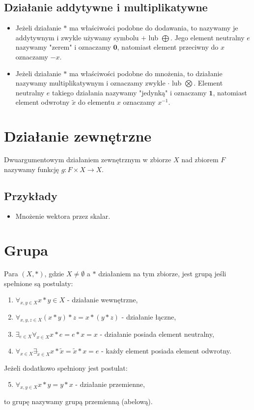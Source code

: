 \documentclass{article}
\begin{document}
\subsection{Działanie addytywne i multiplikatywne}
\begin{itemize}
    \item Jeżeli działanie $*$ ma właściwości podobne do dodawania, to nazywamy je addytywnym i zwykle używamy symbolu $+$ lub $\bigoplus$.
    Jego element neutralny $e$ nazywamy "zerem" i oznaczamy $\textbf{0}$, natomiast element przeciwny do $x$ oznaczamy $-x$.
    \item Jeżeli działanie $*$ ma właściwości podobne do mnożenia, to działanie nazywamy multiplikatywnym i oznaczamy zwykle $\cdot$ lub $\bigotimes$.
    Element neutralny $e$ takiego działania nazywamy "jedynką" i oznaczamy $\textbf{1}$, natomiast element odwrotny $\tilde{x}$ do elementu $x$ oznaczamy $x^{-1}$.
\end{itemize}

\section{Działanie zewnętrzne}
Dwuargumentowym działaniem zewnętrznym w zbiorze $X$ nad zbiorem $F$ nazywamy funkcję $g : F \times X \rightarrow X$.

\subsection{Przykłady}
\begin{itemize}
    \item Mnożenie wektora przez skalar.
\end{itemize}

\section{Grupa}
Para $(X, *)$, gdzie $X \neq \emptyset$ a $*$ działaniem na tym zbiorze, jest grupą jeśli spełnione są postulaty:
\begin{enumerate}
    \item $\forall_{x,y \in X} x * y \in X$ - działanie wewnętrzne,
    \item $\forall_{x, y, z \in X} (x * y) * z = x * (y * z)$ - działanie łączne,
    \item $\exists_{e \in X} \forall_{x \in X} x * e = e * x = x$ - działanie posiada element neutralny,
    \item $\forall_{x \in X} \exists_{\tilde{x} \in X} x * \tilde{x} = \tilde{x} * x = e$ - każdy element posiada element odwrotny.
\end{enumerate}
Jeżeli dodatkowo spełniony jest postulat:
\begin{enumerate}
    \setcounter{enumi}{4}
    \item $\forall_{x,y \in X} x * y = y * x$ - działanie przemienne,
\end{enumerate}
to grupę nazywamy grupą przemienną (abelową).
\end{document}
